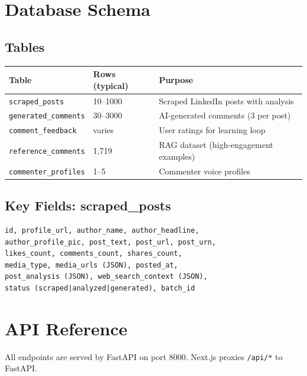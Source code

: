 \documentclass[12pt,a4paper]{article}
\begin{document}
\section{Database Schema}

\subsection{Tables}

\begin{center}
\small
\begin{tabularx}{\textwidth}{llX}
\toprule
\textbf{Table} & \textbf{Rows (typical)} & \textbf{Purpose} \\
\midrule
\texttt{scraped\_posts} & 10--1000 & Scraped LinkedIn posts with analysis \\
\texttt{generated\_comments} & 30--3000 & AI-generated comments (3 per post) \\
\texttt{comment\_feedback} & varies & User ratings for learning loop \\
\texttt{reference\_comments} & 1,719 & RAG dataset (high-engagement examples) \\
\texttt{commenter\_profiles} & 1--5 & Commenter voice profiles \\
\bottomrule
\end{tabularx}
\end{center}

\subsection{Key Fields: scraped\_posts}
\begin{lstlisting}
id, profile_url, author_name, author_headline,
author_profile_pic, post_text, post_url, post_urn,
likes_count, comments_count, shares_count,
media_type, media_urls (JSON), posted_at,
post_analysis (JSON), web_search_context (JSON),
status (scraped|analyzed|generated), batch_id
\end{lstlisting}

\section{API Reference}

All endpoints are served by FastAPI on port 8000. Next.js proxies \texttt{/api/*} to FastAPI.
\end{document}
